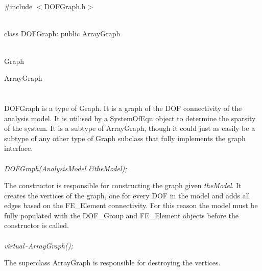 
 \\

   \\
\#include $<$DOFGraph.h$>$  


  \\
class DOFGraph: public ArrayGraph 


 \\
Graph 

\indent\indent ArrayGraph \\
\indent\indent{} \\

  \\
\indent DOFGraph is a type of Graph. It is a graph of the DOF
connectivity of the analysis model. It is utilised by a SystemOfEqn
object to determine the sparsity of the system. It is a subtype of
ArrayGraph, though it could just as easily be a subtype of any other
type of Graph subclass that fully implements the graph interface. \\ 

  \\
{\em DOFGraph(AnalysisModel \&theModel);}  

The constructor is responsible for constructing the graph given {\em
theModel}. It creates the vertices of the graph, one for every
DOF in the model and adds all edges based on the FE\_Element
connectivity. For this reason the model must be fully populated with
the DOF\_Group and FE\_Element objects before the constructor is
called. \\

  \\
{\em virtual~$\tilde{}$ArrayGraph();}  

The superclass ArrayGraph is responsible for destroying the vertices. \\

  \\

  \\
